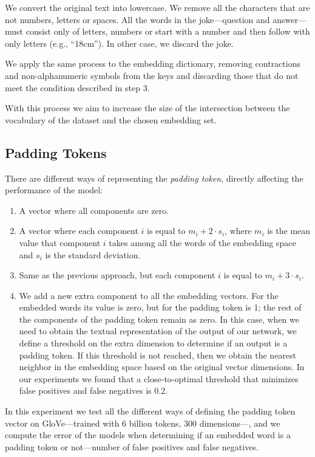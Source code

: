 \documentclass[]{article}
\begin{document}
	We convert the original text into lowercase.
	We remove all the characters that are not numbers, letters or spaces.
	All the words in the joke---question and answer---must consist only of letters, numbers or start with a number and then follow with only letters (e.g., ``18cm''). In other case, we discard the joke.
	
	We apply the same process to the embedding dictionary, removing contractions and non-alphanumeric symbols from the keys and discarding those that do not meet the condition described in step 3.
	
	With this process we aim to increase the size of the intersection between the vocabulary of the dataset and the chosen embedding set.
	
	\subsection{Padding Tokens}
	
	There are different ways of representing the \emph{padding token}, directly affecting the performance of the model:
	
	\begin{enumerate}
		\item A vector where all components are zero.
		\item A vector where each component $ i $ is equal to $ m_i + 2 \cdot s_i $, where $ m_i $ is the mean value that component $ i $ takes among all the words of the embedding space and $ s_i $ is the standard deviation.
		\item Same as the previous approach, but each component $ i $ is equal to $ m_i + 3 \cdot s_i $.
		\item We add a new extra component to all the embedding vectors. For the embedded words its value is zero, but for the padding token is 1; the rest of the components of the padding token remain as zero. In this case, when we need to obtain the textual representation of the output of our network, we define a threshold on the extra dimension to determine if an output is a padding token. If this threshold is not reached, then we obtain the nearest neighbor in the embedding space based on the original vector dimensions. In our experiments we found that a close-to-optimal threshold that minimizes false positives and false negatives is 0.2.
	\end{enumerate}
	
	In this experiment we test all the different ways of defining the padding token vector on GloVe---trained with 6 billion tokens, 300 dimensions---, and we compute the error of the models when determining if an embedded word is a padding token or not---number of false positives and false negatives.
	
\end{document}
